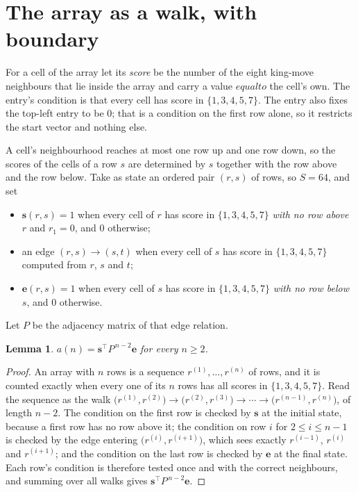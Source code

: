 \documentclass[11pt,a4paper]{article}
\theoremstyle{plain}
\newtheorem{lemma}[theorem]{Lemma}
\theoremstyle{definition}
\begin{document}
\section{The array as a walk, with boundary}

For a cell of the array let its \emph{score} be the number of the eight king-move neighbours that lie inside
the array and carry a value $equal to$ the cell's own. The entry's condition is that every cell
has score in $\{1,3,4,5,7\}$. The entry also fixes the top-left entry to be $0$; that is a condition on the first row alone, so it restricts the start vector and nothing else.

A cell's neighbourhood reaches at most one row up and one row down, so the scores of the
cells of a row $s$ are determined by $s$ together with the row above and the row below.
Take as state an ordered pair $(r,s)$ of rows, so $S=64$, and set
\begin{itemize}
\item $\mathbf{s}(r,s)=1$ when every cell of $r$ has score in $\{1,3,4,5,7\}$ \emph{with no row
above $r$} and $r_1=0$, and $0$ otherwise;
\item an edge $(r,s)\to(s,t)$ when every cell of $s$ has score in $\{1,3,4,5,7\}$ computed from
$r$, $s$ and $t$;
\item $\mathbf{e}(r,s)=1$ when every cell of $s$ has score in $\{1,3,4,5,7\}$ \emph{with no row
below $s$}, and $0$ otherwise.
\end{itemize}
Let $P$ be the adjacency matrix of that edge relation.

\begin{lemma}\label{lem:walk}
$a(n)=\mathbf{s}^{\!\top}P^{\,n-2}\mathbf{e}$ for every $n\ge2$.
\end{lemma}

\begin{proof}
An array with $n$ rows is a sequence $r^{(1)},\dots,r^{(n)}$ of rows, and it is counted
exactly when every one of its $n$ rows has all scores in $\{1,3,4,5,7\}$. Read the sequence as the
walk $\bigl(r^{(1)},r^{(2)}\bigr)\to\bigl(r^{(2)},r^{(3)}\bigr)\to\cdots\to
\bigl(r^{(n-1)},r^{(n)}\bigr)$, of length $n-2$. The condition on the first row is
checked by $\mathbf{s}$ at the initial state, because a first row has no row above it; the
condition on row $i$ for $2\le i\le n-1$ is checked by the edge entering
$\bigl(r^{(i)},r^{(i+1)}\bigr)$, which sees exactly $r^{(i-1)}$, $r^{(i)}$ and
$r^{(i+1)}$; and the condition on the last row is checked by $\mathbf{e}$ at the final
state. Each row's condition is therefore tested once and with the correct neighbours, and
summing over all walks gives $\mathbf{s}^{\!\top}P^{\,n-2}\mathbf{e}$.
\end{proof}
\end{document}
